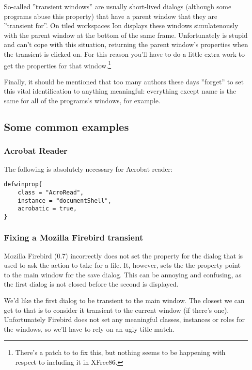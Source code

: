 So-called ''transient windows'' are usually short-lived dialogs (although
some programs abuse this property) that have a parent window that they are
''transient for''. On tiled workspaces Ion displays these windows 
simulatenously with the parent window at the bottom of the same frame.
Unfortunately  is stupid and can't cope with this situation,
returning the parent window's properties when the transient is clicked on.
For this reason you'll have to do a little extra work to get the properties
for that window.\footnote{There's a patch to  to
fix this, but nothing seems to be happening with respect to including it in 
XFree86.}

Finally, it should be mentioned that too many authors these days
''forget'' to set this vital identification to anything meaningful:
everything except name is the same for all of the programs's 
windows, for example.

\subsection{Some common examples}

\subsubsection{Acrobat Reader}

The following is absolutely necessary for Acrobat reader:

\begin{verbatim}
defwinprop{
    class = "AcroRead",
    instance = "documentShell",
    acrobatic = true,
}
\end{verbatim}

\subsubsection{Fixing a Mozilla Firebird transient}

Mozilla Firebird (0.7) incorrectly does not set the  
property for the dialog that is used to ask the action to take for a file.
It, however, sets the the property point to the main window for the save
dialog. This can be annoying and confusing, as the first dialog is not 
closed before the second is displayed.

We'd like the first dialog to be transient to the main window. The closest
we can get to that is to consider it transient to the current window (if
there's one). Unfortunately Firebird does not set any meaningful classes, 
instances or roles for the windows, so we'll have to rely on an ugly title
match.

